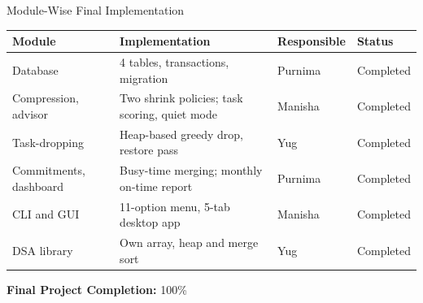 \documentclass[aspectratio=169,11pt]{beamer}
\newcommand{\smallnote}[1]{%
\vspace{0.08cm}
{\scriptsize\color{GEUGrey}#1}
}
\begin{document}
\begin{frame}{Module-Wise Final Implementation}

\scriptsize

\begin{center}

\renewcommand{\arraystretch}{1.35}

\begin{tabularx}{.96\textwidth}
{@{}p{2.4cm}X p{2.0cm}p{2.0cm}@{}}

\toprule
\textbf{Module} &
\textbf{Implementation} &
\textbf{Responsible} &
\textbf{Status}\\
\midrule

Database &
4 tables, transactions, migration &
Purnima &
Completed\\

Compression, advisor &
Two shrink policies; task scoring, quiet mode &
Manisha &
Completed\\

Task-dropping &
Heap-based greedy drop, restore pass &
Yug &
Completed\\

Commitments, dashboard &
Busy-time merging; monthly on-time report &
Purnima &
Completed\\

CLI and GUI &
11-option menu, 5-tab desktop app &
Manisha &
Completed\\

DSA library &
Own array, heap and merge sort &
Yug &
Completed\\

\bottomrule

\end{tabularx}

\end{center}

\vspace{4mm}

\begin{center}
\colorbox{GEULightBlue}{
\parbox{.40\textwidth}{
\centering
\textbf{Final Project Completion:}
 100\% 
}}
\end{center}

\vfill

\smallnote{

}

\end{frame}
\end{document}
